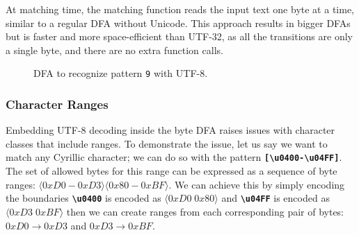At matching time, the matching function reads the input text one byte at a time, similar to a regular DFA without Unicode. This approach results in bigger DFAs but is faster and more space-efficient than UTF-32, as all the transitions are only a single byte, and there are no extra function calls.

\begin{figure}[htbp]
\centering
\begin{adjustbox}{width=1.1\textwidth,center=\textwidth}
\end{adjustbox}
\caption{DFA to recognize pattern \texttt{9\textvisiblespace \textsterling} with UTF-8.}\label{fig:utf8exdfa}
\end{figure}


\subsubsection{Character Ranges}
Embedding UTF-8 decoding inside the byte DFA raises issues with character classes that include ranges. To demonstrate the issue, let us say we want to match any Cyrillic character; we can do so with the pattern \texttt{\textbf{[\textbackslash u0400-\textbackslash u04FF]}}. The set of allowed bytes for this range can be expressed as a sequence of byte ranges: $\langle0xD0-0xD3\rangle \langle0x80-0xBF\rangle$. We can achieve this by simply encoding the boundaries \texttt{\textbf{\textbackslash u0400}} is encoded as $\langle0xD0 \; 0x80\rangle$ and \texttt{\textbf{\textbackslash u04FF}} is encoded as $\langle0xD3 \; 0xBF\rangle$ then we can create ranges from each corresponding pair of bytes: $0xD0 \rightarrow 0xD3$ and $0xD3 \rightarrow 0xBF$.

